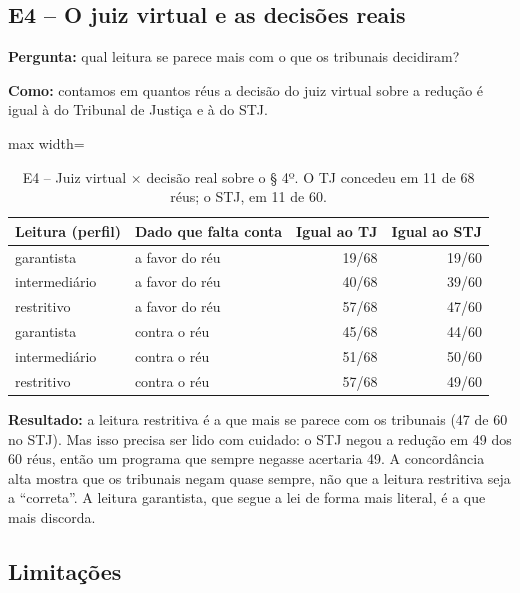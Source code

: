 \subsection*{E4 -- O juiz virtual e as decisões reais}

\textbf{Pergunta:} qual leitura se parece mais com o que os tribunais decidiram?

\textbf{Como:} contamos em quantos réus a decisão do juiz virtual sobre a redução é igual
à do Tribunal de Justiça e à do STJ.

\begin{table}[h]
\centering\small
\caption{E4 -- Juiz virtual $\times$ decisão real sobre o § 4º. O TJ concedeu em 11 de 68 réus; o STJ, em 11 de 60.}
\label{tab:e4}
\begin{adjustbox}{max width=\textwidth}
\begin{tabular}{llrr}
\toprule
Leitura (perfil) & Dado que falta conta & Igual ao TJ & Igual ao STJ \\
\midrule
garantista & a favor do réu & 19/68 & 19/60 \\
intermediário & a favor do réu & 40/68 & 39/60 \\
restritivo & a favor do réu & 57/68 & 47/60 \\
garantista & contra o réu & 45/68 & 44/60 \\
intermediário & contra o réu & 51/68 & 50/60 \\
restritivo & contra o réu & 57/68 & 49/60 \\
\bottomrule
\end{tabular}
\end{adjustbox}
\end{table}

\textbf{Resultado:} a leitura restritiva é a que mais se parece com os tribunais (47 de 60
no STJ). Mas isso precisa ser lido com cuidado: o STJ negou a redução em 49 dos 60 réus, então
um programa que sempre negasse acertaria 49. A concordância alta mostra que os tribunais
negam quase sempre, não que a leitura restritiva seja a ``correta''. A leitura garantista,
que segue a lei de forma mais literal, é a que mais discorda.

\subsection*{Limitações}

